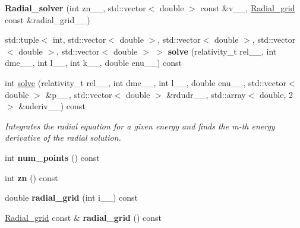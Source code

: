 \begin{DoxyCompactItemize}
\item 
\hypertarget{classsirius_1_1_radial__solver_af5843654667e4f7bef9501e53cea48ee}{}{\bfseries Radial\+\_\+solver} (int zn\+\_\+\+\_\+, std\+::vector$<$ double $>$ const \&v\+\_\+\+\_\+, \hyperlink{classsirius_1_1_radial__grid}{Radial\+\_\+grid} const \&radial\+\_\+grid\+\_\+\+\_\+)\label{classsirius_1_1_radial__solver_af5843654667e4f7bef9501e53cea48ee}

\item 
\hypertarget{classsirius_1_1_radial__solver_a728b0de30915e88d77ec8913ffe91113}{}std\+::tuple$<$ int, std\+::vector$<$ double $>$, std\+::vector$<$ double $>$, std\+::vector$<$ double $>$, std\+::vector$<$ double $>$ $>$ {\bfseries solve} (relativity\+\_\+t rel\+\_\+\+\_\+, int dme\+\_\+\+\_\+, int l\+\_\+\+\_\+, int k\+\_\+\+\_\+, double enu\+\_\+\+\_\+) const \label{classsirius_1_1_radial__solver_a728b0de30915e88d77ec8913ffe91113}

\item 
int \hyperlink{classsirius_1_1_radial__solver_ad21632dfb5686e2bad1379d60cb2789c}{solve} (relativity\+\_\+t rel\+\_\+\+\_\+, int dme\+\_\+\+\_\+, int l\+\_\+\+\_\+, double enu\+\_\+\+\_\+, std\+::vector$<$ double $>$ \&p\+\_\+\+\_\+, std\+::vector$<$ double $>$ \&rdudr\+\_\+\+\_\+, std\+::array$<$ double, 2 $>$ \&uderiv\+\_\+\+\_\+) const 
\begin{DoxyCompactList}\small\item\em Integrates the radial equation for a given energy and finds the m-\/th energy derivative of the radial solution. \end{DoxyCompactList}\item 
\hypertarget{classsirius_1_1_radial__solver_a3c12cab10fc2019329bf918e0a0c81a6}{}int {\bfseries num\+\_\+points} () const \label{classsirius_1_1_radial__solver_a3c12cab10fc2019329bf918e0a0c81a6}

\item 
\hypertarget{classsirius_1_1_radial__solver_ac41ef301a8b9fd9e6d89fa9f1f92e4c9}{}int {\bfseries zn} () const \label{classsirius_1_1_radial__solver_ac41ef301a8b9fd9e6d89fa9f1f92e4c9}

\item 
\hypertarget{classsirius_1_1_radial__solver_ab85a606271786ed34cd73b913a28747c}{}double {\bfseries radial\+\_\+grid} (int i\+\_\+\+\_\+) const \label{classsirius_1_1_radial__solver_ab85a606271786ed34cd73b913a28747c}

\item 
\hypertarget{classsirius_1_1_radial__solver_af77e1b2638fd6eea9528ea0a6d8dd4f4}{}\hyperlink{classsirius_1_1_radial__grid}{Radial\+\_\+grid} const \& {\bfseries radial\+\_\+grid} () const \label{classsirius_1_1_radial__solver_af77e1b2638fd6eea9528ea0a6d8dd4f4}

\end{DoxyCompactItemize}
